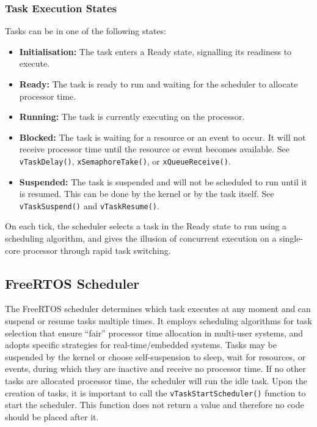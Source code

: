\documentclass{article}
\begin{document}
\subsubsection{Task Execution States}
Tasks can be in one of the following states:
\begin{itemize}
    \item \textbf{Initialisation:} The task enters a Ready state,
          signalling its readiness to execute.
    \item \textbf{Ready:} The task is ready to run and waiting for the
          scheduler to allocate processor time.
    \item \textbf{Running:} The task is currently executing on the
          processor.
    \item \textbf{Blocked:} The task is waiting for a resource or an
          event to occur. It will not receive processor time until the
          resource or event becomes available. See \texttt{vTaskDelay()},
          \texttt{xSemaphoreTake()}, or
          \texttt{xQueueReceive()}.
    \item \textbf{Suspended:} The task is suspended and will not be
          scheduled to run until it is resumed. This can be done by the
          kernel or by the task itself. See \texttt{vTaskSuspend()}
          and \texttt{vTaskResume()}.
\end{itemize}
On each tick, the scheduler selects a task in the Ready state to run
using a scheduling algorithm, and gives the illusion of concurrent
execution on a single-core processor through rapid task switching.
\subsection{FreeRTOS Scheduler}
The FreeRTOS scheduler determines which task executes at any moment and
can suspend or resume tasks multiple times. It employs scheduling
algorithms for task selection that ensure ``fair'' processor time
allocation in multi-user systems, and adopts specific strategies for
real-time/embedded systems. Tasks may be suspended by the kernel or
choose self-suspension to sleep, wait for resources, or events, during
which they are inactive and receive no processor time. If no other
tasks are allocated processor time, the scheduler will run the idle
task. Upon the creation of tasks, it is important to call the
\texttt{vTaskStartScheduler()} function to start the scheduler.
This function does not return a value and therefore no code should be
placed after it.
\end{document}
